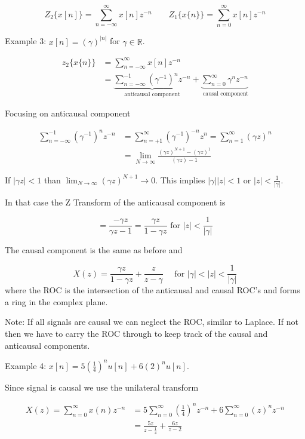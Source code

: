 \documentclass{article}
\begin{document}
$$
Z_{2}\{x[n]\}=\sum_{n=-\infty}^{\infty} x[n] z^{-n} \qquad Z_{1}\{x\{n\}\}=\sum_{n=0}^{\infty} x[n] z^{-n}
$$

Example 3: $x[n]=(\gamma)^{|n|}$ for $\gamma\in\mathbb{R}$.

$$
\begin{aligned}
  z_{2}\{x\{n\}\} &=\sum_{n=-\infty}^{\infty} x[n] z^{-n}\\
  &= \underbrace{\sum_{n=-\infty}^{-1}\left(\gamma^{-1}\right)^{n} z^{-n}}_{\text { anticausal component }} + \underbrace{\sum_{n=0}^{\infty} \gamma^{n} z^{-n}}_{\text { causal component}}
\end{aligned}
$$

Focusing on anticausal component

$$
\begin{aligned}
\sum_{n=-\infty}^{-1}\left(\gamma^{-1}\right)^{n} z^{-n} & =\sum_{n=+1}^{\infty}\left(\gamma^{-1}\right)^{-n} z^{n}=\sum_{n=1}^{\infty}\left(\gamma z\right)^{n} \\
& =\lim _{N \rightarrow \infty} \frac{(\gamma z)^{N+1}-(\gamma z)^{1}}{(\gamma z)-1}
\end{aligned}
$$

If $|\gamma z|<1$ than $\lim_{N \rightarrow \infty}(\gamma z)^{N+1} \rightarrow 0$. This implies $|\gamma||z|<1$ or $|z|<\frac{1}{|\gamma|}$.

In that case the Z Transform of the anticausal component is

$$
=\frac{-\gamma z}{\gamma z - 1}=\frac{\gamma z}{1-\gamma z} \text { for  } |z|<\frac{1}{|\gamma|}
$$

The causal component is the same as before and

$$
X(z) =\frac{\gamma z}{1-\gamma z}+\frac{z}{z-\gamma} \quad \text { for } |\gamma|<|z|<\frac{1}{|\gamma|} 
$$
where the ROC is the intersection of the anticausal and causal ROC's and forms a ring in the complex plane.

Note: If all signals are causal we can neglect the ROC, similar to Laplace. If not then we have to carry the ROC through to keep track of the causal and anticausal components.

Example 4: $x[n]=5\left(\frac{1}{4}\right)^{n} u[n]+6(2)^{n} u[n]$.

Since signal is causal we use the unilateral transform

$$
\begin{aligned}
X(z)=\sum_{n=0}^{\infty} x(n) z^{-n} & =5 \sum_{n=0}^{\infty}\left(\frac{1}{4}\right)^{n} z^{-n}+6 \sum_{n=0}^{\infty}(z)^{n} z^{-n} \\
& =\frac{5 z}{z-\frac{1}{4}}+\frac{6 z}{z-2}
\end{aligned}
$$
\end{document}
